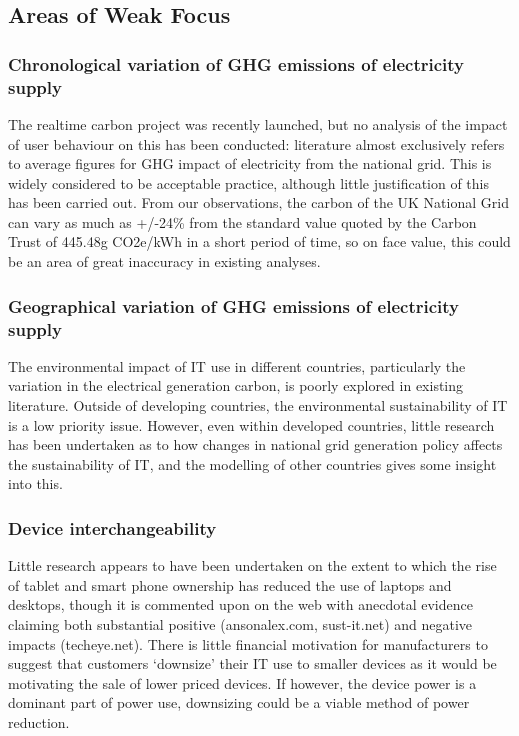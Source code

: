 \documentclass[conference]{IEEEtran}
\begin{document}
\subsection{Areas of Weak Focus}

\subsubsection{Chronological variation of GHG emissions of electricity
  supply}

The realtime carbon project was recently launched, but no analysis of
the impact of user behaviour on this has been conducted: literature
almost exclusively refers to average figures for GHG impact of
electricity from the national grid. This is widely considered to be
acceptable practice, although little justification of this has been
carried out. From our observations, the carbon of the UK National Grid
can vary as much as +/-24\% from the standard value quoted by the
Carbon Trust of 445.48g CO2e/kWh in a short period of time, so on face
value, this could be an area of great inaccuracy in existing analyses.

\subsubsection{Geographical variation of GHG emissions of electricity
  supply}

The environmental impact of IT use in different countries,
particularly the variation in the electrical generation carbon, is
poorly explored in existing literature. Outside of developing
countries, the environmental sustainability of IT is a low priority
issue. However, even within developed countries, little research has
been undertaken as to how changes in national grid generation policy
affects the sustainability of IT, and the modelling of other countries
gives some insight into this.

\subsubsection{Device interchangeability}

Little research appears to have been undertaken on the extent to which
the rise of tablet and smart phone ownership has reduced the use of
laptops and desktops, though it is commented upon on the web with
anecdotal evidence claiming both substantial positive (ansonalex.com,
sust-it.net) and negative impacts (techeye.net). There is little
financial motivation for manufacturers to suggest that customers
‘downsize’ their IT use to smaller devices as it would be motivating
the sale of lower priced devices. If however, the device power is a
dominant part of power use, downsizing could be a viable method of
power reduction.
\end{document}
